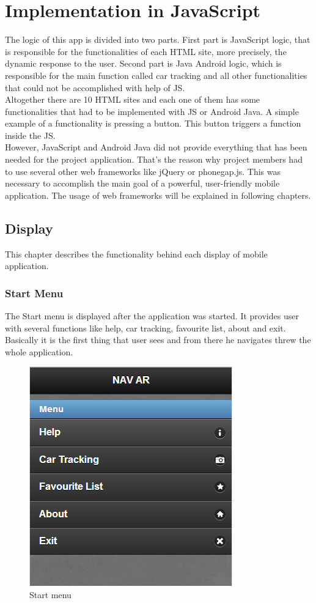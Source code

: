 \chapter{Implementation in JavaScript} \label{chapter:desgin}

The logic of this app is divided into two parts. First part is JavaScript logic, that is responsible for the functionalities of each HTML site, more precisely, the dynamic response to the user. Second part is Java Android logic, which is responsible for the main function called car tracking and all other functionalities that could not be accomplished with help of JS. 
\\

Altogether there are 10 HTML sites and each one of them has some functionalities that had to be implemented with JS or Android Java. A simple example of a functionality is pressing a button. This button triggers a function inside the JS. 
\\

However, JavaScript and Android Java did not provide everything that has been needed for the project application. That's the reason why project members had to use several other web frameworks like jQuery or phonegap.js. This was necessary to accomplish the main goal of a powerful, user-friendly mobile application. The usage of web frameworks will be explained in following chapters. 
\newpage



\section{Display}
This chapter describes the functionality behind each display of mobile application. 


\subsection{Start Menu}
The Start menu is displayed after the application was started. It provides user with several functions like help, car tracking, favourite list, about and exit. Basically it is the first thing that user sees and from there he navigates threw the whole application.
\\

\begin{figure}[h]
\centering
\includegraphics[width=0.5\linewidth]{graphics/chapter4/1}
\caption{Start menu}
\end{figure}



